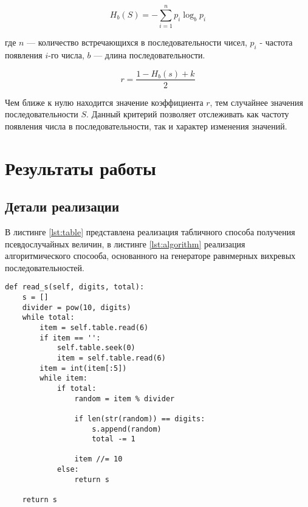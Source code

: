 \begin{equation}
\label{for:entropy}
 H_b(S) = - \sum_{i=1}^{n} p_i \log_b p_i
\end{equation}

где $n$ --- количество встречающихся в последовательности чисел, $p_i$ - частота появления $i$-го числа, $b$ --- длина последовательности.

\begin{equation}
\label{for:koeff}
 r = \frac{1 - H_b(s) + k}{2}
\end{equation}


Чем ближе к нулю находится значение коэффициента $r$, тем случайнее значения последовательности $S$.
Данный критерий позволяет отслеживать как частоту появления числа в последовательности, так и характер изменения значений.

\section*{Результаты работы}

\subsection*{Детали реализации}

В листинге \ref{lst:table} представлена реализация табличного способа получения псевдослучайных величин, в листинге \ref{lst:algorithm} реализация алгоритмического спосооба, основанного на генераторе равнмерных вихревых последовательностей. 
\clearpage

\begin{center}
\captionsetup{justification=raggedright,singlelinecheck=off}
\begin{lstlisting}[label=lst:table,caption=Реализация табличного способа]
def read_s(self, digits, total):
    s = []
    divider = pow(10, digits)
    while total:
        item = self.table.read(6)
        if item == '':
            self.table.seek(0)
            item = self.table.read(6)
        item = int(item[:5])
        while item:
            if total:
                random = item % divider

                if len(str(random)) == digits:
                    s.append(random)
                    total -= 1

                item //= 10
            else:
                return s

    return s
\end{lstlisting}
\end{center}


